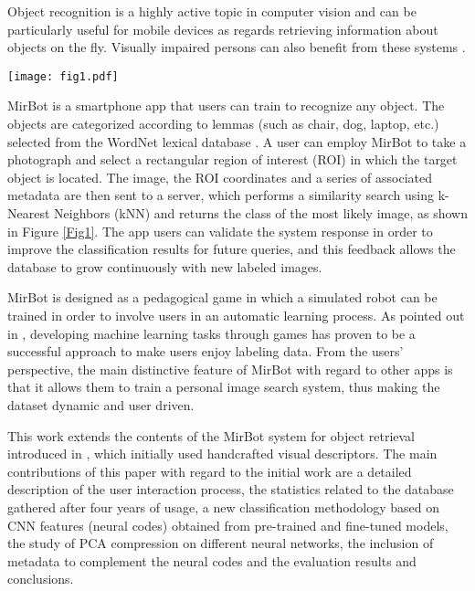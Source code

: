 \documentclass[final, twocolumn]{elsarticle}
\begin{document}
Object recognition is a highly active topic in computer vision and can be particularly useful for mobile devices \citep{Bock2010IImage:IPhone, mobilenets} as regards retrieving information about objects on the fly. Visually impaired persons can also benefit from these systems \citep{Matusiak2013ObjectUsers}.

\begin{figure*}%
\centering
\texttt{[image: fig1.pdf]}
\caption{\label{Fig1} Architecture of the iOS app. This example corresponds to the longest user interaction sequence. }
\end{figure*}

MirBot is a smartphone app that users can train to recognize any object. The objects are categorized according to lemmas (such as chair, dog, laptop, etc.) selected from the WordNet lexical database \citep{Fellbaum1998WordNet:Database}. A user can employ MirBot to take a photograph and select a rectangular region of interest (ROI) in which the target object is located. The image, the ROI coordinates and a series of associated metadata are then sent to a server, which performs a similarity search using k-Nearest Neighbors (kNN) and returns the class of the most likely image, as shown in Figure \ref{Fig1}. The app users can validate the system response in order to improve the classification results for future queries, and this feedback allows the database to grow continuously with new labeled images.

MirBot is designed as a pedagogical game in which a simulated robot can be trained in order to involve users in an automatic learning process. As pointed out in \cite{Barrington2012Game-poweredLearning.,vonAhn2004LabelingGame}, developing machine learning tasks through games has proven to be a successful approach to make users enjoy labeling data. From the users' perspective, the main distinctive feature of MirBot with regard to other apps is that it allows them to train a personal image search system, thus making the dataset dynamic and user driven.

This work extends the contents of the MirBot system for object retrieval introduced in \cite{MirBot:System}, which initially used handcrafted visual descriptors. The main contributions of this paper with regard to the initial work are a detailed description of the user interaction process, the statistics related to the database gathered after four years of usage, a new classification methodology based on CNN features (neural codes) obtained from pre-trained and fine-tuned models, the study of PCA compression on different neural networks, the inclusion of metadata to complement the neural codes and the evaluation results and conclusions.
\end{document}
